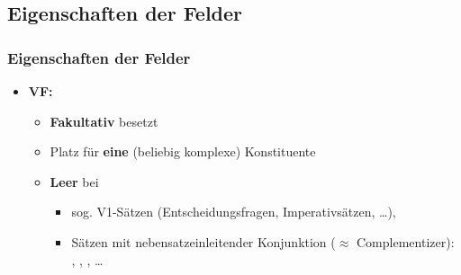 \subsection{Eigenschaften der Felder}


\begin{frame}
\frametitle{Eigenschaften der Felder}

\begin{itemize}
	\item \textbf{VF:}

\begin{table}
\centering
{}

\end{table}

\pause

\begin{itemize}
	\item \textbf{Fakultativ} besetzt
	\item Platz für \textbf{eine} (beliebig komplexe) Konstituente 
	\item \textbf{Leer} bei 
	
	\begin{itemize}
		\item sog. V1-Sätzen (Entscheidungsfragen, Imperativsätzen, \dots ),
		
		\item Sätzen mit nebensatzeinleitender Konjunktion ($\approx$ Complementizer): , , , \dots 
	
	\end{itemize}	
\end{itemize}


\end{itemize}

\end{frame}


